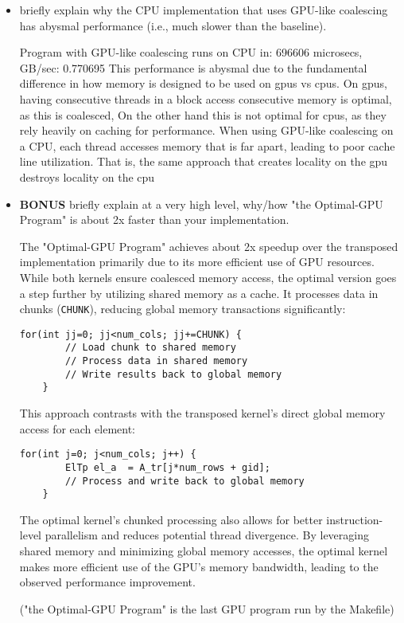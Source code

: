 \documentclass{article}
\begin{document}
\begin{itemize}
    \item briefly explain why the CPU implementation that uses GPU-like
    coalescing has abysmal performance (i.e., much slower than the baseline).
    
    Program with GPU-like coalescing runs on CPU in: 696606 microsecs, GB/sec: 0.770695
    This performance is abysmal due to the fundamental difference in how memory is designed to be used on gpus vs cpus. 
    On gpus, having consecutive threads in a block access consecutive memory is optimal, as this is coalesced, 
    On the other hand this is not optimal for cpus, as they rely heavily on caching for performance.
    When using GPU-like coalescing on a CPU, each thread accesses memory that is far apart, leading to poor cache line utilization. 
    That is, the same approach that creates locality on the gpu destroys locality on the cpu

    \item \textbf{BONUS} briefly explain at a very high level, why/how
    "the Optimal-GPU Program" is about 2x faster than your implementation.

    The "Optimal-GPU Program" achieves about 2x speedup over the transposed implementation primarily due to its more efficient use of GPU resources. While both kernels ensure coalesced memory access, the optimal version goes a step further by utilizing shared memory as a cache. It processes data in chunks (\texttt{CHUNK}), reducing global memory transactions significantly:

    \begin{lstlisting}[language=cuda]
    for(int jj=0; jj<num_cols; jj+=CHUNK) {
        // Load chunk to shared memory
        // Process data in shared memory
        // Write results back to global memory
    }
    \end{lstlisting}

    This approach contrasts with the transposed kernel's direct global memory access for each element:

    \begin{lstlisting}[language=cuda]
    for(int j=0; j<num_cols; j++) {
        ElTp el_a  = A_tr[j*num_rows + gid];
        // Process and write back to global memory
    }
    \end{lstlisting}

    The optimal kernel's chunked processing also allows for better instruction-level parallelism and reduces potential thread divergence. By leveraging shared memory and minimizing global memory accesses, the optimal kernel makes more efficient use of the GPU's memory bandwidth, leading to the observed performance improvement.


   ("the Optimal-GPU Program" is the last GPU program run by the Makefile)
\end{itemize}
\end{document}
